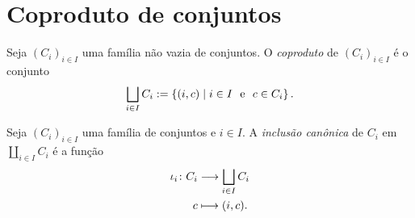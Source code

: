 





\section{Coproduto de conjuntos}

\begin{definition}
Seja $(C_i)_{i \in I}$ uma família não vazia de conjuntos. O \emph{coproduto} de $(C_i)_{i \in I}$ é o conjunto
	\begin{equation*}
	\bigsqcup_{i \in I} C_i :=\left\{{(i,c)}\;\middle\vert\;{i \in I \text{\ \ e\ \ } c \in C_i}\right\}.
	\end{equation*}
\end{definition}

\begin{definition}
Seja $(C_i)_{i \in I}$ uma família de conjuntos e $i \in I$. A \emph{inclusão canônica} de $C_i$ em $\coprod_{i \in I} C_i$ é a função
	\begin{align*}
	{\iota_i}\colon {C_i} &\longrightarrow {\bigsqcup_{i \in I} C_i} \\{c} &\longmapsto (i,c).
	\end{align*}
\end{definition}

